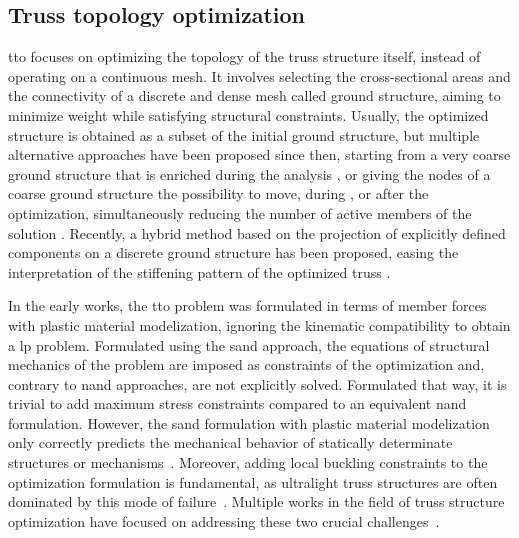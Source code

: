 \subsection{Truss topology optimization}
\acrfull{tto} focuses on optimizing the topology of the truss structure itself, instead of operating on a continuous mesh. It involves selecting the cross-sectional areas and the connectivity of a discrete and dense mesh called ground structure, aiming to minimize weight while satisfying structural constraints. Usually, the optimized structure is obtained as a subset of the initial ground structure, but multiple alternative approaches have been proposed since then, \eg starting from a very coarse ground structure that is enriched during the analysis , or giving the nodes of a coarse ground structure the possibility to move, during , or after the optimization, simultaneously reducing the number of active members of the solution . Recently, a hybrid method based on the projection of explicitly defined components on a discrete ground structure has been proposed, easing the interpretation of the stiffening pattern of the optimized truss .

In the early works, the \gls{tto} problem was formulated in terms of member forces~ with plastic material modelization, ignoring the kinematic compatibility to obtain a \gls{lp} problem. Formulated using the \gls{sand} approach, the equations of structural mechanics of the problem are imposed as constraints of the optimization and, contrary to \gls{nand} approaches, are not explicitly solved. Formulated that way, it is trivial to add maximum stress constraints compared to an equivalent \gls{nand} formulation. However, the \gls{sand} formulation with plastic material modelization only correctly predicts the mechanical behavior of statically determinate structures or mechanisms~. Moreover, adding local buckling constraints to the optimization formulation is fundamental, as ultralight truss structures are often dominated by this mode of failure~. Multiple works in the field of truss structure optimization have focused on addressing these two crucial challenges~.

